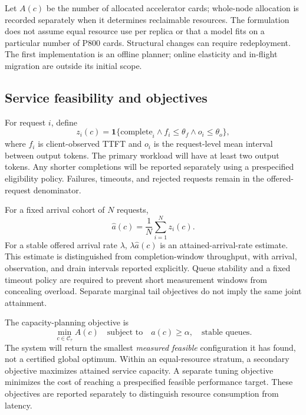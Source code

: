 \documentclass[preprint,12pt]{elsarticle}
\begin{document}
Let $A(c)$ be the number of allocated accelerator cards; whole-node allocation is recorded separately when it determines reclaimable resources. The formulation does not assume equal resource use per replica or that a model fits on a particular number of P800 cards. Structural changes can require redeployment. The first implementation is an offline planner; online elasticity and in-flight migration are outside its initial scope.

\subsection{Service feasibility and objectives}
For request $i$, define
\begin{equation}
 z_i(c)=\mathbf{1}\{\text{complete}_i \land f_i\leq\theta_f
                  \land o_i\leq\theta_o\},
\end{equation}
where $f_i$ is client-observed TTFT and $o_i$ is the request-level mean interval between output tokens. The primary workload will have at least two output tokens. Any shorter completions will be reported separately using a prespecified eligibility policy. Failures, timeouts, and rejected requests remain in the offered-request denominator.

For a fixed arrival cohort of $N$ requests,
\begin{equation}
 \widehat a(c)=\frac{1}{N}\sum_{i=1}^{N}z_i(c).
\end{equation}
For a stable offered arrival rate $\lambda$, $\lambda\widehat a(c)$ is an attained-arrival-rate estimate. This estimate is distinguished from completion-window throughput, with arrival, observation, and drain intervals reported explicitly. Queue stability and a fixed timeout policy are required to prevent short measurement windows from concealing overload. Separate marginal tail objectives do not imply the same joint attainment.

The capacity-planning objective is
\begin{equation}
 \min_{c\in\mathcal{C}_{\tau}} A(c)
 \quad\text{subject to}\quad
 a(c)\geq\alpha,\quad\text{stable queues}.
 \label{eq:capacity}
\end{equation}
The system will return the smallest \emph{measured feasible} configuration it has found, not a certified global optimum. Within an equal-resource stratum, a secondary objective maximizes attained service capacity. A separate tuning objective minimizes the cost of reaching a prespecified feasible performance target. These objectives are reported separately to distinguish resource consumption from latency.
\end{document}
